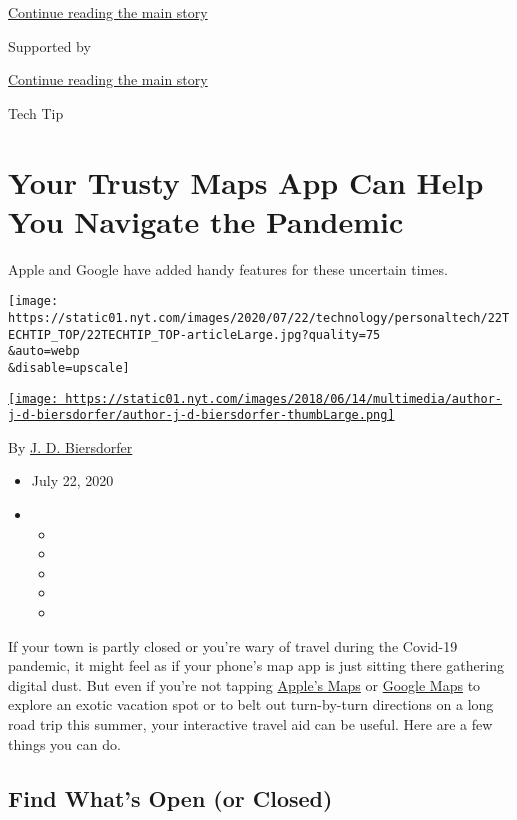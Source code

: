 \protect\hyperlink{after-top}{Continue reading the main story}

Supported by

\protect\hyperlink{after-sponsor}{Continue reading the main story}

Tech Tip

\hypertarget{your-trusty-maps-app-can-help-you-navigate-the-pandemic}{%
\section{Your Trusty Maps App Can Help You Navigate the
Pandemic}\label{your-trusty-maps-app-can-help-you-navigate-the-pandemic}}

Apple and Google have added handy features for these uncertain times.

\texttt{[image: https://static01.nyt.com/images/2020/07/22/technology/personaltech/22TECHTIP\_TOP/22TECHTIP\_TOP-articleLarge.jpg?quality=75\\\&auto=webp\\\&disable=upscale]}

\href{https://www.nytimes.com/by/j-d-biersdorfer}{\texttt{[image: https://static01.nyt.com/images/2018/06/14/multimedia/author-j-d-biersdorfer/author-j-d-biersdorfer-thumbLarge.png]}}

By \href{https://www.nytimes.com/by/j-d-biersdorfer}{J. D. Biersdorfer}

\begin{itemize}
\item
  July 22, 2020
\item
  \begin{itemize}
  \item
  \item
  \item
  \item
  \item
  \end{itemize}
\end{itemize}

If your town is partly closed or you're wary of travel during the
Covid-19 pandemic, it might feel as if your phone's map app is just
sitting there gathering digital dust. But even if you're not tapping
\href{https://www.apple.com/ios/maps/}{Apple's Maps} or
\href{https://www.google.com/maps/about/\#!/}{Google Maps} to explore an
exotic vacation spot or to belt out turn-by-turn directions on a long
road trip this summer, your interactive travel aid can be useful. Here
are a few things you can do.

\hypertarget{find-whats-open-or-closed}{%
\subsection{Find What's Open (or
Closed)}\label{find-whats-open-or-closed}}

